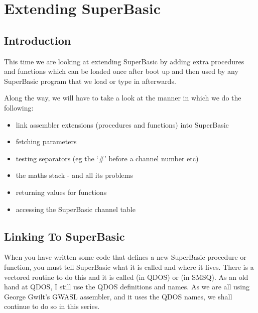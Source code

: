 \chapter{Extending SuperBasic}

\section{Introduction}
\label{ch7-intro}%

This time we are looking at extending SuperBasic by adding extra
    procedures and functions which can be loaded once after boot up and then
    used by any SuperBasic program that we load or type in afterwards.

Along the way, we will have to take a look at the manner in which we
    do the following:
\begin{itemize}[itemsep=0pt]

\item{}link assembler extensions (procedures and functions) into
        SuperBasic


\item{}fetching parameters


\item{}testing separators (eg the `\#' before a channel number
        etc)


\item{}the maths stack -{} and all its problems


\item{}returning values for functions


\item{}accessing the SuperBasic channel table

\end{itemize}

\section{Linking To SuperBasic}
\label{ch7-linking-superbasic}%

When you have written some code that defines a new SuperBasic
    procedure or function, you must tell SuperBasic what it is called and
    where it lives. There is a vectored routine to do this and it is called
     (in QDOS) or  (in SMSQ). As an old hand at QDOS, I still
    use the QDOS definitions and names. As we are all using George Gwilt's
    GWASL assembler, and it uses the QDOS names, we shall continue to do so in
    this series.

